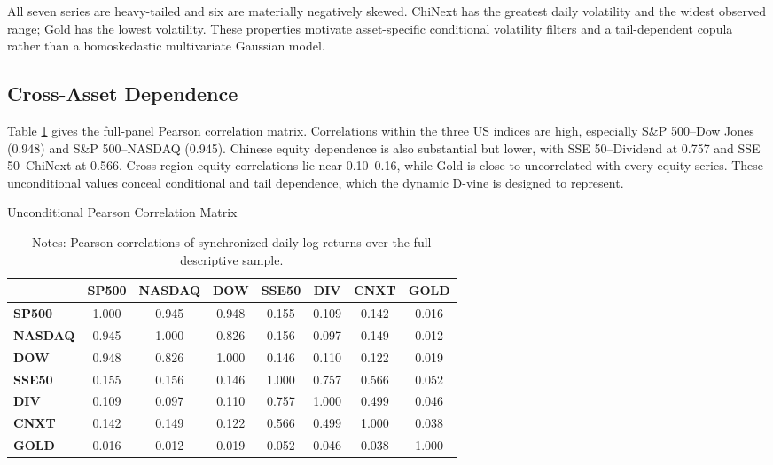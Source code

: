 All seven series are heavy-tailed and six are materially negatively skewed. ChiNext has the greatest daily volatility and the widest observed range; Gold has the lowest volatility. These properties motivate asset-specific conditional volatility filters and a tail-dependent copula rather than a homoskedastic multivariate Gaussian model.

\subsection{Cross-Asset Dependence}
\label{subsec:4_correlation}

Table \ref{tab:correlation} gives the full-panel Pearson correlation matrix. Correlations within the three US indices are high, especially S\&P 500--Dow Jones (0.948) and S\&P 500--NASDAQ (0.945). Chinese equity dependence is also substantial but lower, with SSE 50--Dividend at 0.757 and SSE 50--ChiNext at 0.566. Cross-region equity correlations lie near 0.10--0.16, while Gold is close to uncorrelated with every equity series. These unconditional values conceal conditional and tail dependence, which the dynamic D-vine is designed to represent.

\begin{table}[H]
\centering
\caption{Unconditional Pearson Correlation Matrix}
\label{tab:correlation}
\begin{tabular}{l c c c c c c c}
\toprule
 & \textbf{SP500} & \textbf{NASDAQ} & \textbf{DOW} & \textbf{SSE50} & \textbf{DIV} & \textbf{CNXT} & \textbf{GOLD} \\
\midrule
\textbf{SP500} & 1.000 & 0.945 & 0.948 & 0.155 & 0.109 & 0.142 & 0.016 \\
\textbf{NASDAQ} & 0.945 & 1.000 & 0.826 & 0.156 & 0.097 & 0.149 & 0.012 \\
\textbf{DOW} & 0.948 & 0.826 & 1.000 & 0.146 & 0.110 & 0.122 & 0.019 \\
\textbf{SSE50} & 0.155 & 0.156 & 0.146 & 1.000 & 0.757 & 0.566 & 0.052 \\
\textbf{DIV} & 0.109 & 0.097 & 0.110 & 0.757 & 1.000 & 0.499 & 0.046 \\
\textbf{CNXT} & 0.142 & 0.149 & 0.122 & 0.566 & 0.499 & 1.000 & 0.038 \\
\textbf{GOLD} & 0.016 & 0.012 & 0.019 & 0.052 & 0.046 & 0.038 & 1.000 \\
\bottomrule
\end{tabular}
\caption*{\footnotesize Notes: Pearson correlations of synchronized daily log returns over the full descriptive sample.}
\end{table}

